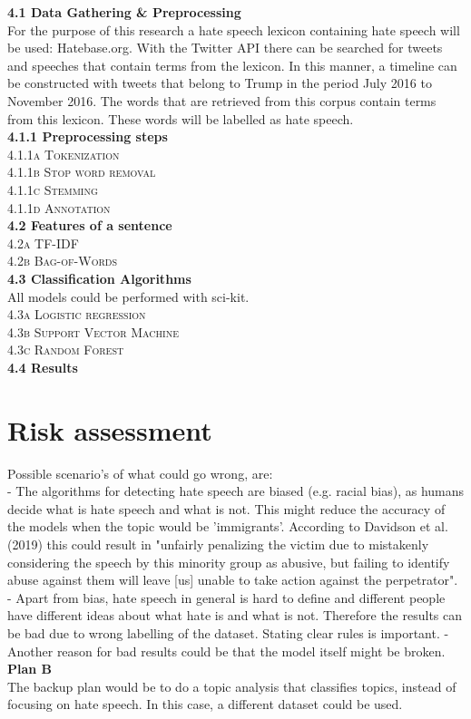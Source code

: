 \documentclass[a4paper,pdf]{article} %
\begin{document}
\textbf{4.1 Data Gathering \& Preprocessing}\\
\break
For the purpose of this research a hate speech lexicon containing hate speech will be used: Hatebase.org. With the Twitter API there can be searched for tweets and speeches that contain terms from the lexicon. In this manner, a timeline can be constructed with tweets that belong to Trump in the period July 2016 to November 2016. The words that are retrieved from this corpus contain terms from this lexicon. These words will be labelled as hate speech. \\
\break
\textbf{4.1.1 Preprocessing steps}\\
\textsc{4.1.1a Tokenization}\\
\textsc{4.1.1b Stop word removal}\\
\textsc{4.1.1c Stemming}\\
\textsc{4.1.1d Annotation}\\
\break
\textbf{4.2 Features of a sentence}\\
\textsc{4.2a TF-IDF}\\
\textsc{4.2b Bag-of-Words}\\
\break
\textbf{4.3 Classification Algorithms}\\
All models could be performed with sci-kit. \\
\textsc{4.3a Logistic regression}\\
\textsc{4.3b Support Vector Machine}\\
\textsc{4.3c Random Forest}\\
\break
\textbf{4.4 Results}

\section{Risk assessment}
Possible scenario's of what could go wrong, are: \\
\break
- The algorithms for detecting hate speech are biased (e.g. racial bias), as humans decide what is hate speech and what is not. This might reduce the accuracy of the models when the topic would be 'immigrants'. According to Davidson et al. (2019) this could result in "unfairly penalizing the victim due to mistakenly considering the speech by this minority group as abusive, but failing to identify abuse against them will leave [us] unable to take action against the perpetrator".\\
- Apart from bias, hate speech in general is hard to define and different people have different ideas about what hate is and what is not. Therefore the results can be bad due to wrong labelling of the dataset. Stating clear rules is important.
\break
- Another reason for bad results could be that the model itself might be broken.\\
\break
\textbf{Plan B}\\
The backup plan would be to do a topic analysis that classifies topics, instead of focusing on hate speech. In this case, a different dataset could be used.
	
\end{document}
